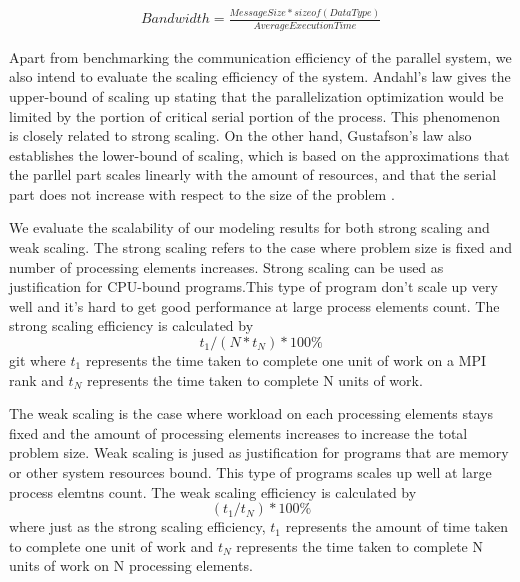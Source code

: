 \begin{equation*}
    \begin{aligned}
        Bandwidth = \frac{MessageSize * sizeof(DataType)} {AverageExecutionTime}
    \end{aligned}
\end{equation*}


Apart from benchmarking the communication efficiency of the parallel system, we also intend to evaluate the scaling efficiency of the system. Andahl's law \cite{hill2008amdahl} gives the upper-bound of scaling up stating that the parallelization optimization would be limited by the portion of critical serial portion of the process. This phenomenon is closely related to strong scaling. On the other hand, Gustafson's law \cite{gustafson1988reevaluating} also establishes the lower-bound of scaling, which is based on the approximations that the parllel part scales linearly with the amount of resources, and that the serial part does not increase with respect to the size of the problem \cite{scalabilityStrongWeakScaling}. 

We evaluate the scalability of our modeling results for both strong scaling and weak scaling. The strong scaling refers to the case where problem size is fixed and number of processing elements increases. Strong scaling can be used as justification for CPU-bound programs.This type of program don't scale up very well and it's hard to get good performance at large process elements count. The strong scaling efficiency is calculated by
\begin{equation*}
t_1 / ( N * t_N ) * 100\% 
\end{equation*}git 
where $t_1$ represents the time taken to complete one unit of work on a MPI rank and $t_N$ represents the time taken to complete N units of work. 

The weak scaling is the case where workload on each processing elements stays fixed and the amount of processing elements increases to increase the total problem size. Weak scaling is jused as justification for programs that are memory or other system resources bound. This type of programs scales up well at large process elemtns count. The weak scaling efficiency is calculated by
\begin{equation*}
( t_1 / t_N ) * 100\% 
\end{equation*}
where just as the strong scaling efficiency, $t_1$ represents the amount of time taken to complete one unit of work and $t_N$ represents the time taken to complete N units of work on N processing elements.